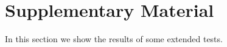 \section{Supplementary Material}
\label{sec:sm}
 In this section we show the results of some extended tests.

